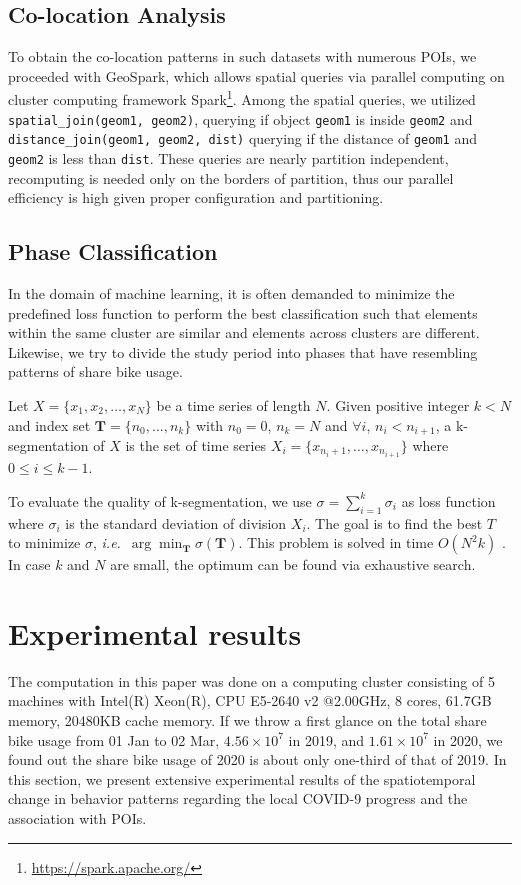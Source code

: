 \documentclass[ijgi,submit,moreauthors,pdftex]{Definitions/mdpi}
\begin{document}
\subsection{Co-location Analysis}\label{sec:co-location}
To obtain the co-location patterns in such datasets with numerous POIs, we proceeded with GeoSpark, which allows spatial queries via parallel computing on cluster computing framework Spark\footnote{\url{https://spark.apache.org/}}.
Among the spatial queries, we utilized \texttt{spatial\_join(geom1, geom2)}, querying if object \texttt{geom1} is inside \texttt{geom2} and \texttt{distance\_join(geom1, geom2, dist)} querying if the distance of \texttt{geom1} and \texttt{geom2} is less than \texttt{dist}.
These queries are nearly partition independent, recomputing is needed only on the borders of partition, thus our parallel efficiency is high given proper configuration and partitioning.

\subsection{Phase Classification}\label{sec:phase_classification}
In the domain of machine learning, it is often demanded to minimize the predefined loss function to perform the best classification such that elements within the same cluster are similar and elements across clusters are different.
Likewise, we try to divide the study period into phases that have resembling patterns of share bike usage.

\begin{Definition}[k-segmentation]\label{def:k-seg}
Let $X=\{x_1,x_2,\ldots,x_N\}$ be a time series of length $N$.
Given positive integer $k<N$ and index set $\mathbf{T}=\{n_0,\ldots,n_k\}$ with $n_0=0$, $n_k=N$ and $\forall i$, $n_i<n_{i+1}$, a k-segmentation of $X$ is the set of time series $X_i=\{x_{n_i+1},\ldots,x_{n_{i+1}}\}$ where $0\leq i\leq k-1$.
\end{Definition}

To evaluate the quality of k-segmentation, we use $\sigma=\sum_{i=1}^{k}{\sigma_i}$ as loss function where $\sigma_i$ is the standard deviation of division $X_i$. 
The goal is to find the best $T$ to minimize $\sigma$, \textit{i.e.}\ $\arg\min_{\mathbf{T}}\sigma(\mathbf{T})$.
This problem is solved in time $O(N^2k)$ \cite{terzi2006efficient}.
In case $k$ and $N$ are small, the optimum can be found via exhaustive search.


\section{Experimental results}\label{sec:experimental results}
The computation in this paper was done on a computing cluster consisting of 5 machines with Intel(R) Xeon(R), CPU E5-2640 v2 @2.00GHz, 8 cores, 61.7GB memory, 20480KB cache memory. 
If we throw a first glance on the total share bike usage from 01 Jan to 02 Mar, $4.56\times10^7$ in 2019, and $1.61\times10^7$ in 2020, we found out the share bike usage of 2020 is about only one-third of that of 2019.
In this section, we present extensive experimental results of the spatiotemporal change in behavior patterns regarding the local COVID-9 progress and the association with POIs.
\end{document}
